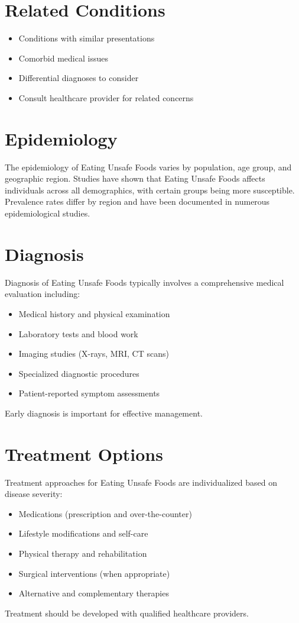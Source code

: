 \section*{Related Conditions}
\begin{itemize}
  \item Conditions with similar presentations
  \item Comorbid medical issues
  \item Differential diagnoses to consider
  \item Consult healthcare provider for related concerns
\end{itemize}

\section*{Epidemiology}
The epidemiology of Eating Unsafe Foods varies by population, age group, and geographic region. Studies have shown that Eating Unsafe Foods affects individuals across all demographics, with certain groups being more susceptible. Prevalence rates differ by region and have been documented in numerous epidemiological studies.

\section*{Diagnosis}
Diagnosis of Eating Unsafe Foods typically involves a comprehensive medical evaluation including:
\begin{itemize}
  \item Medical history and physical examination
  \item Laboratory tests and blood work
  \item Imaging studies (X-rays, MRI, CT scans)
  \item Specialized diagnostic procedures
  \item Patient-reported symptom assessments
\end{itemize}
Early diagnosis is important for effective management.

\section*{Treatment Options}
Treatment approaches for Eating Unsafe Foods are individualized based on disease severity:
\begin{itemize}
  \item Medications (prescription and over-the-counter)
  \item Lifestyle modifications and self-care
  \item Physical therapy and rehabilitation
  \item Surgical interventions (when appropriate)
  \item Alternative and complementary therapies
\end{itemize}
Treatment should be developed with qualified healthcare providers.

